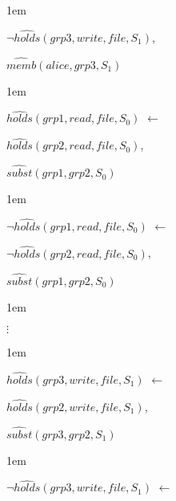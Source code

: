 \documentclass[global,twocolumn,final]{svjour}
\newenvironment{vquote}
  {\begin{list}{}{\leftmargin 1em}\item[]}
  {\end{list}}
\begin{document}
\begin{enumerate}
\begin{vquote}
           \hspace{1em}
           $\lnot \hat{holds}(grp3, write, file, S_{1})$,

           \hspace{1em}
           $\hat{memb}(alice, grp3, S_{1})$
         \end{vquote}

         \begin{vquote}
           $\hat{holds}(grp1, read, file, S_{0})$ $\leftarrow$

           \hspace{1em}
           $\hat{holds}(grp2, read, file, S_{0})$,

           \hspace{1em}
           $\hat{subst}(grp1, grp2, S_{0})$
         \end{vquote}

         \begin{vquote}
           $\lnot \hat{holds}(grp1, read, file, S_{0})$ $\leftarrow$

           \hspace{1em}
           $\lnot \hat{holds}(grp2, read, file, S_{0})$,

           \hspace{1em}
           $\hat{subst}(grp1, grp2, S_{0})$
         \end{vquote}

         \begin{vquote}
           \hspace{2em}$\vdots$
         \end{vquote}

         \begin{vquote}
           $\hat{holds}(grp3, write, file, S_{1})$ $\leftarrow$

           \hspace{1em}
           $\hat{holds}(grp2, write, file, S_{1})$,

           \hspace{1em}
           $\hat{subst}(grp3, grp2, S_{1})$
         \end{vquote}

         \begin{vquote}
           $\lnot \hat{holds}(grp3, write, file, S_{1})$ $\leftarrow$


\end{vquote}
\end{enumerate}
\end{document}
